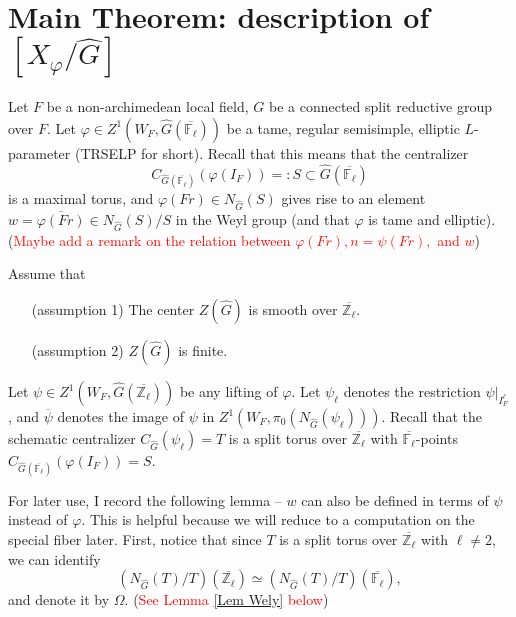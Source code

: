 \documentclass{article}
\newcommand{\red}[1]{\textcolor{red}{#1}}
\begin{document}
\section{Main Theorem: description of $[X_{\varphi}/\hat{G}]$}

Let $F$ be a non-archimedean local field, $G$ be a connected split reductive group over $F$. Let $\varphi \in Z^1(W_F, \hat{G}(\overline{\mathbb{F}_{\ell}}))$ be a tame, regular semisimple, elliptic $L$-parameter (TRSELP for short). Recall that this means that the centralizer 
$$C_{\hat{G}(\overline{\mathbb{F}_{\ell}})}(\varphi(I_F)) =: S \subset \hat{G}(\overline{\mathbb{F}_{\ell}})$$ 
is a maximal torus, and $\varphi(Fr) \in N_{\hat{G}}(S)$ gives rise to an element $w=\overline{\varphi(Fr)} \in N_{\hat{G}}(S)/S$ in the Weyl group (and that $\varphi$ is tame and elliptic). (\red{Maybe add a remark on the relation between $\varphi(Fr), n=\psi(Fr),$ and $w$}) 

Assume that 
\begin{enumerate}
	\item[(assumption 1)] \label{assumption 1} The center $Z(\hat{G})$ is smooth over $\overline{\mathbb{Z}_{\ell}}$.
	\item[(assumption 2)] \label{assumption 2} $Z(\hat{G})$ is finite.
\end{enumerate}

Let $\psi \in Z^1(W_F, \hat{G}(\overline{\mathbb{Z}_{\ell}}))$ be any lifting of $\varphi$. Let $\psi_{\ell}$ denotes the restriction $\psi|_{I_F^{\ell}}$, and $\overline{\psi}$ denotes the image of $\psi$ in $Z^1(W_F, \pi_0(N_{\hat{G}}(\psi_{\ell})))$. Recall that the schematic centralizer $C_{\hat{G}}(\psi_{\ell})=T$ is a split torus over $\overline{\mathbb{Z}_{\ell}}$ with $\overline{\mathbb{F}_{\ell}}$-points $C_{\hat{G}(\overline{\mathbb{F}_{\ell}})}(\varphi(I_F)) = S$. 

For later use, I record the following lemma -- $w$ can also be defined in terms of $\psi$ instead of $\varphi$. This is helpful because we will reduce to a computation on the special fiber later. First, notice that since $T$ is a split torus over $\overline{\mathbb{Z}_{\ell}}$ with $\ell \neq 2$, we can identify
$$\left(N_{\hat{G}}(T)/T\right)(\overline{\mathbb{Z}_{\ell}}) \simeq \left(N_{\hat{G}}(T)/T\right)(\overline{\mathbb{F}_{\ell}}),$$
and denote it by $\Omega$. (\red{See Lemma \ref{Lem Wely} below}) 
\end{document}
